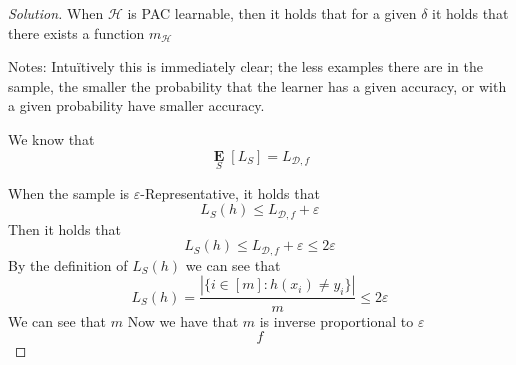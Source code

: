 \documentclass[10pt, a4paper, twoside]{amsart}
\newcommand{\R}{\ensuremath{\mathbb{R}}}
\DeclarePairedDelimiter\cbrac\{\}
\DeclarePairedDelimiter\paren()
\newcommand{\Ev}{\operatorname*{\ensuremath{\mathbf{E}}}}
\newenvironment{solution}
               {\let\oldqedsymbol=\qedsymbol
                \renewcommand{\qedsymbol}{$\blacktriangleleft$}
                \begin{proof}[Solution]}
               {\end{proof}
                \renewcommand{\qedsymbol}{\oldqedsymbol}}
\begin{document}
\begin{solution}
When $\mathcal{H}$ is PAC learnable, then it holds that for a given $\delta$ it holds that there exists a function $m_{\mathcal{H}}$

  
  Notes:
Intu\"itively this is immediately clear; the less examples there are in the sample, the smaller the probability that the learner has a given accuracy, or with a given probability have smaller accuracy.
  
  We know that 
  \begin{equation*}
    \Ev_{S}[L_S] = L_{\mathcal{D},f}
  \end{equation*}
  
  When the sample is $\varepsilon$-Representative, it holds that
  \begin{equation*}
    L_S(h) \leq L_{\mathcal{D},f} +\varepsilon
  \end{equation*}
  Then it holds that
  \begin{equation*}
    L_S(h) \leq L_{\mathcal{D},f} +\varepsilon \leq 2\varepsilon
  \end{equation*}
  By the definition of $L_S(h)$ we can see that
  \begin{equation*}
    L_S(h) = \frac{|\{i \in[m]:h(x_i)\neq y_i \}|}{m} \leq 2\varepsilon
  \end{equation*}
  We can see that $m$ 
  Now we have that $m$ is inverse proportional to $\varepsilon$
  \begin{equation*}
f    
  \end{equation*}
  
  



\end{solution}
\end{document}
